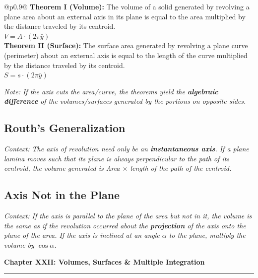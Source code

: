 \documentclass[11pt, a4paper]{article}
\begin{document}
\begin{center}
\begin{tabular}{@{}p{0.9\columnwidth}@{}}
\toprule
\textbf{\color{accent}Theorem I (Volume):} The volume of a solid generated by revolving a plane area about an external axis in its plane is equal to the area multiplied by the distance traveled by its centroid. \\
$V = A \cdot (2\pi \bar{y})$ \\
\midrule
\textbf{\color{accent}Theorem II (Surface):} The surface area generated by revolving a plane curve (perimeter) about an external axis is equal to the length of the curve multiplied by the distance traveled by its centroid. \\
$S = s \cdot (2\pi \bar{y})$ \\
\bottomrule
\end{tabular}
\end{center}

\vspace{0.2cm}

\textit{\small Note: If the axis cuts the area/curve, the theorems yield the \textbf{algebraic difference} of the volumes/surfaces generated by the portions on opposite sides.}

\subsection*{\color{secondary} Routh's Generalization}
\textit{\small Context: The axis of revolution need only be an \textbf{instantaneous axis}. If a plane lamina moves such that its plane is always perpendicular to the path of its centroid, the volume generated is Area $\times$ length of the path of the centroid.}

\subsection*{\color{secondary} Axis Not in the Plane}
\textit{\small Context: If the axis is parallel to the plane of the area but not in it, the volume is the same as if the revolution occurred about the \textbf{projection} of the axis onto the plane of the area. If the axis is inclined at an angle $\alpha$ to the plane, multiply the volume by $\cos\alpha$.}

\newpage

\begin{center}
    {\LARGE \bfseries \color{accent} Chapter XXII: Volumes, Surfaces \& Multiple Integration}\\
    \vspace{0.2cm}
    {\color{accent}\rule{0.55\linewidth}{0.8pt}}
\end{center}
\vspace{0.35cm}
\end{document}
